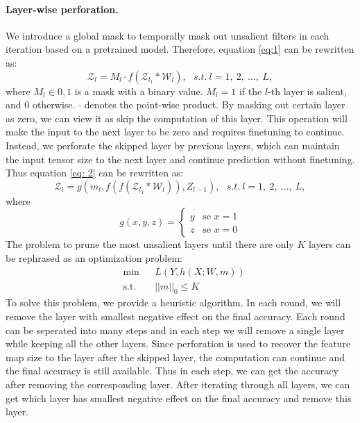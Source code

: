 \documentclass[pageno]{jpaper}
\begin{document}
\paragraph{Layer-wise perforation.}
We introduce a global mask to temporally mask out unsalient filters in each iteration based on a pretrained model. Therefore, equation \ref{eq:1} can be rewritten as:
\begin{equation} \label{eq: 2}
    \mathcal{Z}_l = M_l \cdot f(\mathcal{Z}_{l_1} \ast \mathcal{W}_l), \ \ \  s.t. \: l = 1,\: 2, \: \dots, \: L,
\end{equation}
where $M_l \in {0, 1}$ is a mask with a binary value. $M_l = 1$ if the $l$-th layer is salient, and $0$ otherwise. $\cdot$ denotes the point-wise product. By masking out certain layer as zero, we can view it as skip the computation of this layer. This operation will make the input to the next layer to be zero and requires finetuning to continue. Instead, we perforate the skipped layer by previous layers, which can maintain the input tensor size to the next layer and continue prediction without finetuning. Thus equation \ref{eq: 2} can be rewritten as:
\begin{equation}
    \mathcal{Z}_l = g(m_l, f(f(\mathcal{Z}_{l_1} \ast \mathcal{W}_l)), Z_{l-1}), \ \ \  s.t. \: l = 1,\: 2, \: \dots, \: L,
\end{equation}
where
\begin{equation}
    g(x, y, z) = 
    \begin{cases}
        y &\text{se $x = 1$}\\
        z &\text{se $x = 0$}
    \end{cases}
\end{equation}
The problem to prune the most unsalient layers until there are only $K$ layers can be rephrased as an optimization problem:
\begin{equation*}
\begin{aligned}
& {\text{min}}
& & L(Y, h(X; W, m)) \\
& \text{s.t.}
& & ||m||_0 \leq K
\end{aligned}
\end{equation*}
To solve this problem, we provide a heuristic algorithm. In each round, we will remove the layer with smallest negative effect on the final accuracy. Each round can be seperated into many steps and in each step we will remove a single layer while keeping all the other layers. Since perforation is used to recover the feature map size to the layer after the skipped layer, the computation can continue and the final accuracy is still available. Thus in each step, we can get the accuracy after removing the corresponding layer. After iterating through all layers, we can get which layer has smallest negative effect on the final accuracy and remove this layer.
\end{document}

